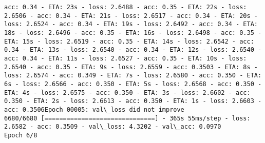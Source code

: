 \documentclass[11pt]{article}
\begin{document}
\begin{Verbatim}[commandchars=\\\{\}]
acc: 0.34 - ETA: 23s - loss: 2.6488 - acc: 0.35 - ETA: 22s - loss: 2.6506 - acc: 0.34 - ETA: 21s - loss: 2.6517 - acc: 0.34 - ETA: 20s - loss: 2.6524 - acc: 0.34 - ETA: 19s - loss: 2.6492 - acc: 0.34 - ETA: 18s - loss: 2.6496 - acc: 0.35 - ETA: 16s - loss: 2.6498 - acc: 0.35 - ETA: 15s - loss: 2.6519 - acc: 0.35 - ETA: 14s - loss: 2.6542 - acc: 0.34 - ETA: 13s - loss: 2.6540 - acc: 0.34 - ETA: 12s - loss: 2.6540 - acc: 0.34 - ETA: 11s - loss: 2.6527 - acc: 0.35 - ETA: 10s - loss: 2.6540 - acc: 0.35 - ETA: 9s - loss: 2.6559 - acc: 0.3503 - ETA: 8s - loss: 2.6574 - acc: 0.349 - ETA: 7s - loss: 2.6580 - acc: 0.350 - ETA: 6s - loss: 2.6566 - acc: 0.350 - ETA: 5s - loss: 2.6568 - acc: 0.350 - ETA: 4s - loss: 2.6575 - acc: 0.350 - ETA: 3s - loss: 2.6602 - acc: 0.350 - ETA: 2s - loss: 2.6613 - acc: 0.350 - ETA: 1s - loss: 2.6603 - acc: 0.3506Epoch 00005: val\_loss did not improve
6680/6680 [==============================] - 365s 55ms/step - loss: 2.6582 - acc: 0.3509 - val\_loss: 4.3202 - val\_acc: 0.0970
Epoch 6/8

\end{Verbatim}
\end{document}
